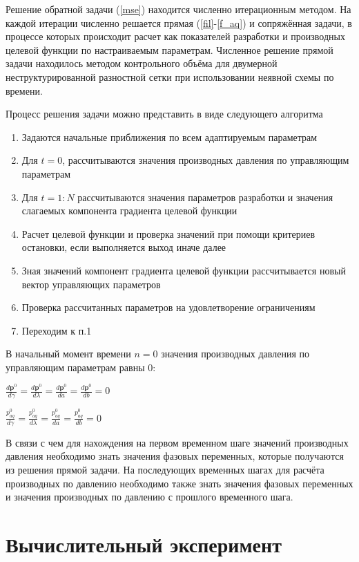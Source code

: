 \documentclass[14pt]{article}
\begin{document}
Решение обратной задачи (\ref{mse}) находится численно итерационным методом. На каждой итерации численно решается прямая (\ref{fil}-\ref{f_aq}) и сопряжённая задачи, в процессе которых происходит расчет как показателей разработки и производных целевой функции по настраиваемым параметрам. Численное решение прямой задачи находилось методом контрольного объёма  для двумерной неструктурированной разностной сетки при использовании неявной схемы по времени.

Процесс решения задачи можно представить в виде следующего алгоритма

\begin{enumerate}
	\item Задаются начальные приближения по всем адаптируемым параметрам
	\item Для $ t=0 $, рассчитываются значения производных давления по управляющим параметрам
	\item Для $ t=1:N $ рассчитываются значения параметров разработки и значения слагаемых компонента градиента целевой функции
	\item Расчет целевой функции и проверка значений при помощи критериев остановки, если выполняется выход иначе далее
	\item Зная значений компонент градиента целевой функции рассчитывается новый вектор управляющих параметров
	\item Проверка рассчитанных параметров на удовлетворение ограничениям
	\item Переходим к п.1
\end{enumerate}

В начальный момент времени $ n=0 $ значения производных давления по управляющим параметрам равны 0:

$\frac{d\boldsymbol{p}^0}{d\gamma} = \frac{d\boldsymbol{p}^0}{d\lambda} = \frac{d\boldsymbol{p}^0}{da} = \frac{d\boldsymbol{p}^0}{db} = 0$

$\frac{p_{aq}^0}{d\gamma} = \frac{p_{aq}^0}{d\lambda} = \frac{p_{aq}^0}{da} = \frac{p_{aq}^0}{db} = 0$

В связи с чем для нахождения на первом временном шаге значений производных давления необходимо знать значения фазовых переменных, которые получаются из решения прямой задачи. На последующих временных шагах для расчёта производных по давлению необходимо также знать значения фазовых переменных и значения производных по давлению с прошлого временного шага.

\section{Вычислительный эксперимент}
\end{document}
